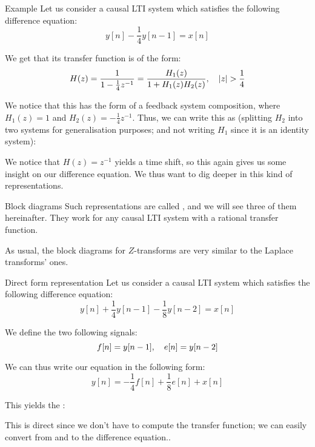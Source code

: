 \documentclass[a4paper]{article}
\begin{document}
\begin{parag}{Example}
    Let us consider a causal LTI system which satisfies the following difference equation: 
    \[y\left[n\right] - \frac{1}{4}y\left[n-1\right] = x\left[n\right]\]

    We get that its transfer function is of the form: 
    \[H\left(z\right) = \frac{1}{1 - \frac{1}{4}z^{-1}} = \frac{H_1\left(z\right)}{1 + H_1\left(z\right)H_2\left(z\right)}, \mathspace \left|z\right| > \frac{1}{4}\]
    
    We notice that this has the form of a feedback system composition, where $H_1\left(z\right) = 1$ and $H_2\left(z\right) = -\frac{1}{4}z^{-1}$. Thus, we can write this as (splitting $H_2$ into two systems for generalisation purposes; and not writing $H_1$ since it is an identity system):

    We notice that $H\left(z\right) = z^{-1}$ yields a time shift, so this again gives us some insight on our difference equation. We thus want to dig deeper in this kind of representations.
\end{parag}

\begin{parag}{Block diagrams}
    Such representations are called , and we will see three of them hereinafter. They work for any causal LTI system with a rational transfer function.

    As usual, the block diagrams for $Z$-transforms are very similar to the Laplace transforms' ones.
\end{parag}

\begin{parag}{Direct form representation}
    Let us consider a causal LTI system which satisfies the following difference equation: 
    \[y\left[n\right] + \frac{1}{4} y\left[n-1\right] - \frac{1}{8}y\left[n-2\right] = x\left[n\right]\]
    
    We define the two following signals: 
    \[f\left[n\right] = y\left[n-1\right], \mathspace e\left[n\right] = y\left[n-2\right]\]
    
    We can thus write our equation in the following form: 
    \[y\left[n\right] = -\frac{1}{4}f\left[n\right] + \frac{1}{8}e\left[n\right] + x\left[n\right]\]

    This yields the :
    
    This is direct since we don't have to compute the transfer function; we can easily convert from and to the difference equation..
\end{parag}
\end{document}
